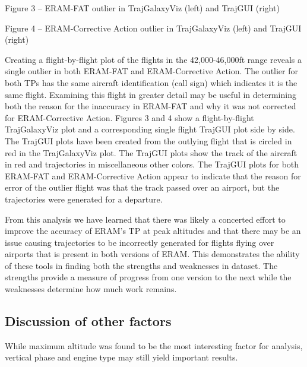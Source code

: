 \documentclass[]{article}
\begin{document}
Figure 3 – ERAM-FAT outlier in TrajGalaxyViz (left) and TrajGUI (right)


Figure 4 – ERAM-Corrective Action outlier in TrajGalaxyViz (left) and TrajGUI (right)

Creating a flight-by-flight plot of the flights in the 42,000-46,000ft range reveals a single outlier in both ERAM-FAT and ERAM-Corrective Action. The outlier for both TPs has the same aircraft identification (call sign) which indicates it is the same flight. Examining this flight in greater detail may be useful in determining both the reason for the inaccuracy in ERAM-FAT and why it was not corrected for ERAM-Corrective Action. Figures 3 and 4 show a flight-by-flight TrajGalaxyViz plot and a corresponding single flight TrajGUI plot side by side. The TrajGUI plots have been created from the outlying flight that is circled in red in the TrajGalaxyViz plot. The TrajGUI plots show the track of the aircraft in red and trajectories in miscellaneous other colors. The TrajGUI plots for both ERAM-FAT and ERAM-Corrective Action appear to indicate that the reason for error of the outlier flight was that the track passed over an airport, but the trajectories were generated for a departure.

From this analysis we have learned that there was likely a concerted effort to improve the accuracy of ERAM’s TP at peak altitudes and that there may be an issue causing trajectories to be incorrectly generated for flights flying over airports that is present in both versions of ERAM. This demonstrates the ability of these tools in finding both the strengths and weaknesses in dataset. The strengths provide a measure of progress from one version to the next while the weaknesses determine how much work remains. 

\subsection{Discussion of other factors}
\label{otherFactors}
While maximum altitude was found to be the most interesting factor for analysis, vertical phase and engine type may still yield important results.
\end{document}
